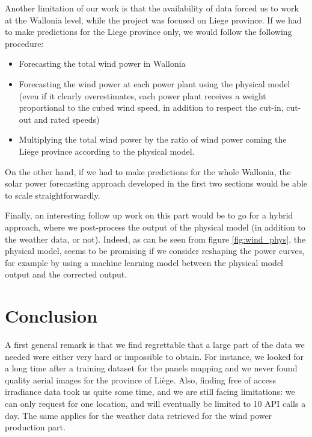 \documentclass[a4paper, 12pt]{article}
\begin{document}
	Another limitation of our work is that the availability of data forced us to work at the Wallonia level, while the project was focused on Liege province. If we had to make predictions for the Liege province only, we would follow the following procedure:
	\begin{itemize}
		\item Forecasting the total wind power in Wallonia
		\item Forecasting the wind power at each power plant using the physical model (even if it clearly overestimates, each power plant receives a weight proportional to the cubed wind speed, in addition to respect the cut-in, cut-out and rated speeds)
		\item Multiplying the total wind power by the ratio of wind power coming the Liege province according to the physical model.
	\end{itemize}
	
	On the other hand, if we had to make predictions for the whole Wallonia, the solar power forecasting approach developed in the first two sections would be able to scale straightforwardly.
	
	Finally, an interesting follow up work on this part would be to go for a hybrid approach, where we post-process the output of the physical model (in addition to the weather data, or not). Indeed, as can be seen from figure \ref{fig:wind_phys}, the physical model, seems to be promising if we consider reshaping the power curves, for example by using a machine learning model between the physical model output and the corrected output.

\newpage
\part*{Conclusion}

A first general remark is that we find regrettable that a large part of the data we needed were either very hard or impossible to obtain. For instance, we looked for a long time after a training dataset for the panels mapping and we never found quality aerial images for the province of Liège. Also, finding free of access irradiance data took us quite some time, and we are still facing limitations: we can only request for one location, and will eventually be limited to 10 API calls a day. The same applies for the weather data retrieved for the wind power production part.
\end{document}
